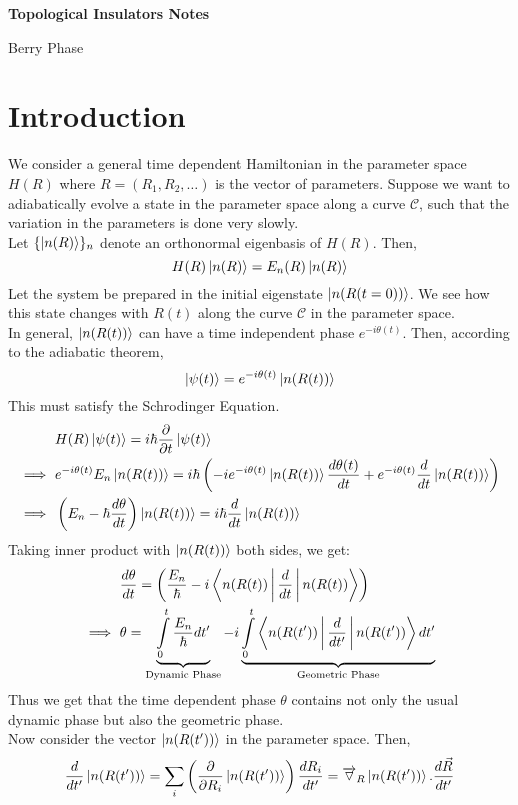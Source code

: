 \documentclass[12pt, oneside, listof=totoc,dvipsnames]{scrbook}
\begin{document}
	
	
	
	\newcommand{\op}[1]{\hat{#1}}
	\newcommand{\tr}[1]{T\ #1 \ T^{-1}}
	
	\vspace*{10cm}
	\begin{center}
		\Huge \textbf{Topological Insulators Notes}
	\end{center}
	\tableofcontents
	\begin{chapter}{Berry Phase}
		\section{Introduction}
		We consider a general time dependent Hamiltonian in the parameter space $H(R)$ where $R=(R_1, R_2, \ldots)$ is the vector of parameters. Suppose we want to adiabatically evolve a state in the parameter space along a curve $\mathcal{C}$, such that the variation in the parameters is done very slowly.\\
		Let $\{\ket{n(R)}\}_n$ denote an orthonormal eigenbasis of $H(R)$. Then, 
		$$H(R)\ket{n(R)}= E_n(R)\ket{n(R)}$$
		Let the system be prepared in the initial eigenstate $\ket{n(R(t=0))}$. We see how this state changes with $R(t)$ along the curve $\mathcal{C}$ in the parameter space.
		\\[0.4cm]
		In general, $\ket{n(R(t))}$ can have a time independent phase $e^{-i\theta(t)}$. Then, according to the adiabatic theorem, $$\ket{\psi(t)}=e^{-i\theta(t)}\ket{n(R(t))}$$
		This must satisfy the Schrodinger Equation.
		\begin{align*}
			&H(R)\ket{\psi(t)}=i\hbar \frac{\partial}{\partial t}\ket{\psi(t)}\\
			\implies \ &e^{-i\theta(t)}E_n \ket{n(R(t))} = i\hbar \left (-i e^{-i\theta (t)} \ket{n(R(t))}\frac{d\theta (t)}{dt}+ e^{-i\theta (t)} \frac{d}{dt}\ket{n(R(t))} \right)\\
			\implies \ & \left(E_n - \hbar \frac{d\theta}{dt}\right)\ket{n(R(t))} = i\hbar \frac{d}{dt}\ket{n(R(t))}
		\end{align*}
		Taking inner product with $\ket{n(R(t))}$ both sides, we get:
		\begin{align*}
			& \frac{d\theta}{dt} = \left( \frac{E_n}{\hbar} -i \Braket{n(R(t))|\frac{d}{dt}|n(R(t))}\right)\\
			\implies \ &\theta = \underbrace{\int \limits_0^t \frac{E_n}
				{\hbar}dt'}_{\text{Dynamic Phase}} - i \underbrace{\int \limits_0^t \Braket{n(R(t'))|\frac{d}{dt'}|n(R(t'))} dt' }_{\text{Geometric Phase}}
		\end{align*}
		Thus we get that the time dependent phase $\theta$ contains not only the usual dynamic phase but also the geometric phase. \\[0.2cm]
		Now consider the vector $ \Ket{n(R(t'))}$ in the parameter space. 
		Then, 
		\[\frac{d}{dt'}\Ket{n(R(t'))}= \sum \limits_i \left(\frac{\partial }{\partial R_i}\Ket{n(R(t'))}\right )\frac{dR_i}{dt'} = \overrightarrow{\triangledown}_R \Ket{n(R(t'))}. \frac{d\vec{R}}{dt'}\]
		

\end{chapter}
\end{document}
